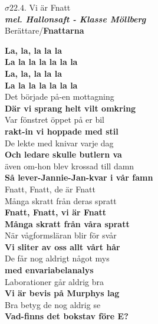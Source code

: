 \documentclass[a6paper,10pt]{article}
\newcommand{\mel}[1]{\small\textbf{\textit{mel. #1 \\}}}
\begin{document}
\setlength{\oddsidemargin}{-0.47in}

\begin{center}
\Large $\sigma22.4$. Vi är Fnatt\\
\mel{Hallonsaft - Klasse Möllberg}
\small Berättare/\textbf{Fnattarna}
\end{center}
\textbf{La, la, la la la\\
La la la la la la la\\
La, la, la la la\\
La la la la la la la}
\vspace{5pt}\\
Det började på-en mottagning\\
\textbf{Där vi sprang helt vilt omkring}
\vspace{5pt}\\
Var fönstret öppet på er bil\\
\textbf{rakt-in vi hoppade med stil}
\vspace{5pt}\\
De lekte med knivar varje dag\\
\textbf{Och ledare skulle butlern va}
\vspace{5pt}\\
även om-hon blev krossad till damn\\
\textbf{Så lever-Jannie-Jan-kvar i vår famn}
\vspace{5pt}\\
Fnatt, Fnatt, de är Fnatt\\
Många skratt från deras spratt\\
\textbf{Fnatt, Fnatt, vi är Fnatt}\\
\textbf{Många skratt från våra spratt}
\vspace{5pt}\\
När vågformsläran blir för svår\\
\textbf{Vi sliter av oss allt vårt hår}
\vspace{5pt}\\
De får nog aldrigt något mys\\
\textbf{med envariabelanalys}
\vspace{5pt}\\
Laborationer går aldrig bra\\
\textbf{Vi är bevis på Murphys lag}
\vspace{5pt}\\
Bra betyg de nog aldrig se\\
\textbf{Vad-finns det bokstav före E?}
\vspace{5pt}\\
\end{document}
